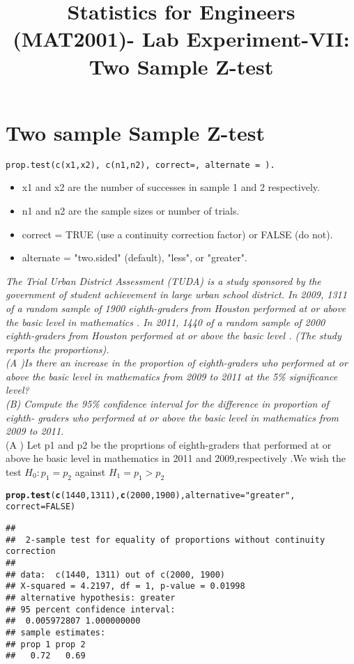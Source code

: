 \documentclass{article}\usepackage[]{graphicx}\usepackage[]{xcolor}
\date{}
\title{\textbf{Statistics for Engineers (MAT2001)- Lab  Experiment-VII:  Two Sample Z-test}}
\makeatletter
\newcommand{\hlnum}[1]{\textcolor[rgb]{0.686,0.059,0.569}{#1}}%
\newcommand{\hlsng}[1]{\textcolor[rgb]{0.192,0.494,0.8}{#1}}%
\newcommand{\hldef}[1]{\textcolor[rgb]{0.345,0.345,0.345}{#1}}%
\newcommand{\hlkwc}[1]{\textcolor[rgb]{0.333,0.667,0.333}{#1}}%
\newcommand{\hlkwd}[1]{\textcolor[rgb]{0.737,0.353,0.396}{\textbf{#1}}}%
\newenvironment{kframe}{%
 \def\at@end@of@kframe{}%
 \ifinner\ifhmode%
  \def\at@end@of@kframe{\end{minipage}}%
  \begin{minipage}{\columnwidth}%
 \fi\fi%
 \def\FrameCommand##1{\hskip\@totalleftmargin \hskip-\fboxsep
 \colorbox{shadecolor}{##1}\hskip-\fboxsep
     \hskip-\linewidth \hskip-\@totalleftmargin \hskip\columnwidth}%
 \MakeFramed {\advance\hsize-\width
   \@totalleftmargin\z@ \linewidth\hsize
   \@setminipage}}%
 {\par\unskip\endMakeFramed%
 \at@end@of@kframe}
\newenvironment{knitrout}{}{} %
\makeatother
\begin{document}
\maketitle
\section{Two sample Sample Z-test}
\begin{verbatim}
prop.test(c(x1,x2), c(n1,n2), correct=, alternate = ).
\end{verbatim}

\begin{itemize}
  \item x1 and x2 are the number of successes in sample 1 and 2 respectively.
  \item n1 and n2 are the sample sizes or number of trials.
  \item correct = TRUE (use a continuity correction factor) or FALSE (do not).
  \item alternate = "two.sided" (default), "less", or "greater".
\end{itemize}
\emph{The Trial Urban District Assessment (TUDA) is a study sponsored by the government of student achievement in large urban school district. In 2009, 1311 of a random sample of 1900 eighth-graders from Houston performed at or above the basic level in mathematics . In 2011, 1440 of a random sample of 2000 eighth-graders from Houston performed at or above the basic level . (The study reports the proportions).\\
(A )Is there an increase in the proportion of eighth-graders who performed at or above the basic level in mathematics from 2009 to 2011 at the 5\% significance level?\\
(B) Compute the 95\% confidence interval for the difference in proportion of eighth-
graders who performed at or above the basic level in mathematics from 2009 to 2011.}\\
(A ) Let p1 and p2 be the proprtions of eighth-graders that performed at or above he basic level in mathematics in 2011 and 2009,respectively .We wish the test
$H_0:p_1=p_2$ against $H_1=p_1> p_2$
\begin{knitrout}
\color{fgcolor}\begin{kframe}
\begin{alltt}
\hlkwd{prop.test}\hldef{(}\hlkwd{c}\hldef{(}\hlnum{1440}\hldef{,} \hlnum{1311}\hldef{),} \hlkwd{c}\hldef{(}\hlnum{2000}\hldef{,} \hlnum{1900}\hldef{),} \hlkwc{alternative} \hldef{=} \hlsng{"greater"}\hldef{,}
          \hlkwc{correct} \hldef{=} \hlnum{FALSE}\hldef{)}
\end{alltt}
\begin{verbatim}
## 
## 	2-sample test for equality of proportions without continuity correction
## 
## data:  c(1440, 1311) out of c(2000, 1900)
## X-squared = 4.2197, df = 1, p-value = 0.01998
## alternative hypothesis: greater
## 95 percent confidence interval:
##  0.005972807 1.000000000
## sample estimates:
## prop 1 prop 2 
##   0.72   0.69
\end{verbatim}
\end{kframe}
\end{knitrout}
\end{document}

